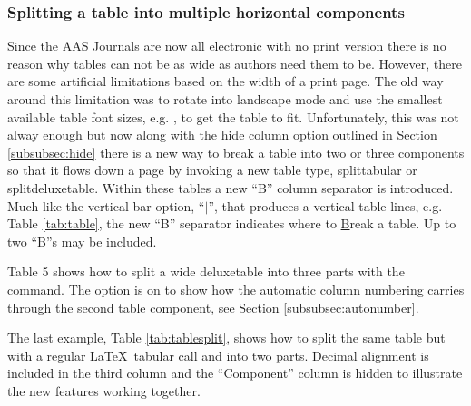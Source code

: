 \documentclass[preprint]{aastex62}
\newcommand\latex{La\TeX}
\begin{document}
\subsubsection{Splitting a table into multiple horizontal components}

Since the AAS Journals are now all electronic with no print version there is
no reason why tables can not be as wide as authors need them to be.
However, there are some artificial limitations based on the width of a
print page.  The old way around this limitation was to rotate into 
landscape mode and use the smallest available table font
sizes, e.g. {\tt\string\tablewidth}, to get the table to fit.
Unfortunately, this was not alway enough but now along with the hide column
option outlined in Section \ref{subsubsec:hide} there is a new way to break
a table into two or three components so that it flows down a page by
invoking a new table type, splittabular or splitdeluxetable. Within these
tables a new ``B'' column separator is introduced.  Much like the vertical
bar option, ``$\vert$'', that produces a vertical table lines, e.g. Table
\ref{tab:table}, the new ``B'' separator indicates where to \underline{B}reak
a table.  Up to two ``B''s may be included.

Table 5 %
shows how to split a wide deluxetable into three parts with
the {\tt\string\splitdeluxetable} command.  The {\tt\string\colnumbers}
option is on to show how the automatic column numbering carries through the
second table component, see Section \ref{subsubsec:autonumber}.

The last example, Table \ref{tab:tablesplit}, shows how to split the same
table but with a regular \latex\ tabular call and into two parts. Decimal
alignment is included in the third column and the ``Component'' column is
hidden to illustrate the new features working together.
\end{document}
